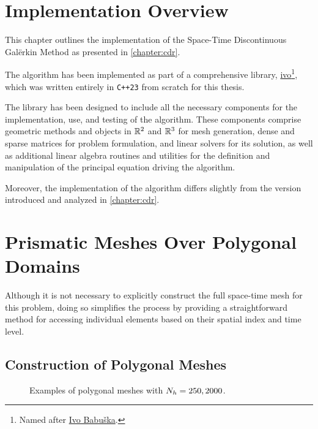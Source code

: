 \section{Implementation Overview}

This chapter outlines the implementation of the Space-Time Discontinuous Galërkin Method as presented in \cref{chapter:cdr}.

The algorithm has been implemented as part of a comprehensive library, \href{https://github.com/diantonioandrea/ivo}{ivo}\footnote{Named after \href{https://en.wikipedia.org/wiki/Ivo_Babuška}{Ivo Babuška}.}, which was written entirely in \lstinline{C++23} from scratch for this thesis.

The library has been designed to include all the necessary components for the implementation, use, and testing of the algorithm. These components comprise geometric methods and objects in $\mathbb{R}^{2}$ and $\mathbb{R}^{3}$ for mesh generation, dense and sparse matrices for problem formulation, and linear solvers for its solution, as well as additional linear algebra routines and utilities for the definition and manipulation of the principal equation driving the algorithm.

Moreover, the implementation of the algorithm differs slightly from the version introduced and analyzed in \cref{chapter:cdr}.

\newpage
\section{Prismatic Meshes Over Polygonal Domains} \label{section:mesh}

Although it is not necessary to explicitly construct the full space-time mesh for this problem, doing so simplifies the process by providing a straightforward method for accessing individual elements based on their spatial index and time level. 

\subsection{Construction of Polygonal Meshes} \label{subsection:pol_mesh}

\begin{figure}[!ht]
    \begin{subfigure}[b]{0.49\textwidth}
		\centering
        
    \end{subfigure}
	\hfill
    \begin{subfigure}[b]{0.49\textwidth}
		\centering
        
    \end{subfigure}
    \caption{Examples of polygonal meshes with $N_h = 250, 2000$.}
\end{figure}

